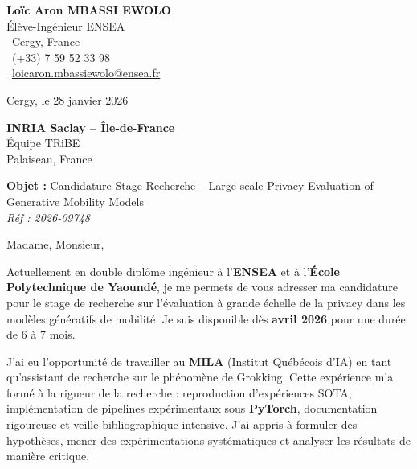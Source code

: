 \documentclass[a4paper,11pt]{article}
\begin{document}
\noindent
\begin{minipage}[t]{0.5\textwidth}
    \textbf{Loïc Aron MBASSI EWOLO}\\
    Élève-Ingénieur ENSEA\\[3pt]
    \faMapMarker\ Cergy, France\\
    \faPhone\ (+33) 7 59 52 33 98\\
    \faEnvelope\ \href{mailto:loicaron.mbassiewolo@ensea.fr}{loicaron.mbassiewolo@ensea.fr}
\end{minipage}
\hfill
\begin{minipage}[t]{0.4\textwidth}
    \raggedleft
    Cergy, le 28 janvier 2026
\end{minipage}

\vspace{1.2cm}

\hfill
\begin{minipage}[t]{0.5\textwidth}
    \raggedleft
    \textbf{INRIA Saclay -- Île-de-France}\\
    Équipe TRiBE\\
    Palaiseau, France
\end{minipage}

\vspace{1cm}

\noindent\textbf{Objet :} Candidature Stage Recherche -- Large-scale Privacy Evaluation of Generative Mobility Models\\
\textit{Réf : 2026-09748}

\vspace{0.8cm}

Madame, Monsieur,

Actuellement en double diplôme ingénieur à l'\textbf{ENSEA} et à l'\textbf{École Polytechnique de Yaoundé}, je me permets de vous adresser ma candidature pour le stage de recherche sur l'évaluation à grande échelle de la privacy dans les modèles génératifs de mobilité. Je suis disponible dès \textbf{avril 2026} pour une durée de 6 à 7 mois.

J'ai eu l'opportunité de travailler au \textbf{MILA} (Institut Québécois d'IA) en tant qu'assistant de recherche sur le phénomène de Grokking. Cette expérience m'a formé à la rigueur de la recherche : reproduction d'expériences SOTA, implémentation de pipelines expérimentaux sous \textbf{PyTorch}, documentation rigoureuse et veille bibliographique intensive. J'ai appris à formuler des hypothèses, mener des expérimentations systématiques et analyser les résultats de manière critique.
\end{document}
